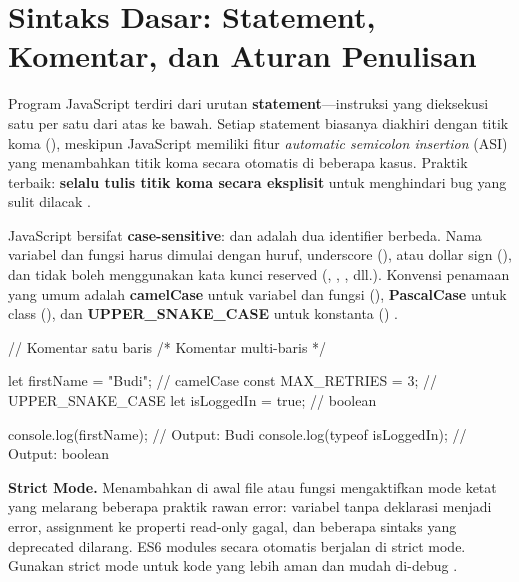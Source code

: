 \section{Sintaks Dasar: Statement, Komentar, dan Aturan Penulisan}

Program JavaScript terdiri dari urutan \textbf{statement}---instruksi yang dieksekusi satu per satu dari atas ke bawah. Setiap statement biasanya diakhiri dengan titik koma (\code{;}), meskipun JavaScript memiliki fitur \textit{automatic semicolon insertion} (ASI) yang menambahkan titik koma secara otomatis di beberapa kasus. Praktik terbaik: \textbf{selalu tulis titik koma secara eksplisit} untuk menghindari bug yang sulit dilacak \cite{jsInfo}.

JavaScript bersifat \textbf{case-sensitive}:  dan  adalah dua identifier berbeda. Nama variabel dan fungsi harus dimulai dengan huruf, underscore (\code{\_}), atau dollar sign (\code{\$}), dan tidak boleh menggunakan kata kunci reserved (, , , dll.). Konvensi penamaan yang umum adalah \textbf{camelCase} untuk variabel dan fungsi (), \textbf{PascalCase} untuk class (), dan \textbf{UPPER\_SNAKE\_CASE} untuk konstanta () \cite{mdnJsGuide}.

\begin{webcode}[language=JavaScript, caption={Statement, komentar, dan penamaan}]
// Komentar satu baris
/* Komentar
   multi-baris */

let firstName = "Budi";      // camelCase
const MAX_RETRIES = 3;        // UPPER_SNAKE_CASE
let isLoggedIn = true;        // boolean

console.log(firstName);       // Output: Budi
console.log(typeof isLoggedIn); // Output: boolean
\end{webcode}

\begin{konsep}
\textbf{Strict Mode.} Menambahkan  di awal file atau fungsi mengaktifkan mode ketat yang melarang beberapa praktik rawan error: variabel tanpa deklarasi menjadi error, assignment ke properti read-only gagal, dan beberapa sintaks yang deprecated dilarang. ES6 modules secara otomatis berjalan di strict mode. Gunakan strict mode untuk kode yang lebih aman dan mudah di-debug \cite{jsInfo}.
\end{konsep}

